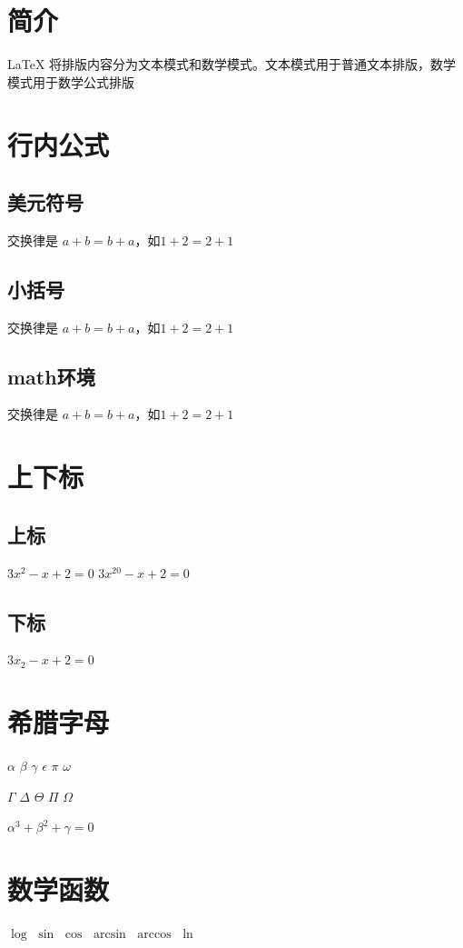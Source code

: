 \documentclass{ctexart}
\begin{document}
    \section{简介}
    \LaTeX{} 将排版内容分为文本模式和数学模式。文本模式用于普通文本排版，数学模式用于数学公式排版
    \section{行内公式}
    \subsection{美元符号}
    交换律是 $a+b=b+a$，如$1+2=2+1$
    \subsection{小括号}
    交换律是 \(a+b=b+a\)，如\(1+2=2+1\)
    \subsection{math环境}
    交换律是 \begin{math}a+b=b+a\end{math}，如\begin{math}1+2=2+1\end{math}

    \section{上下标}
    \subsection{上标}
    $3x^2 - x + 2 = 0$
    $3x^{20} - x + 2 = 0$
    \subsection{下标}
    $3x_2 - x + 2 = 0$

    \section{希腊字母}
    $\alpha$
    $\beta$
    $\gamma$
    $\epsilon$
    $\pi$
    $\omega$

    $\Gamma$
    $\Delta$
    $\Theta$
    $\Pi$
    $\Omega$

    $\alpha^3 + \beta^2 + \gamma = 0$

    \section{数学函数}
    $\log$
    $\sin$
    $\cos$
    $\arcsin$
    $\arccos$
    $\ln$
\end{document}
